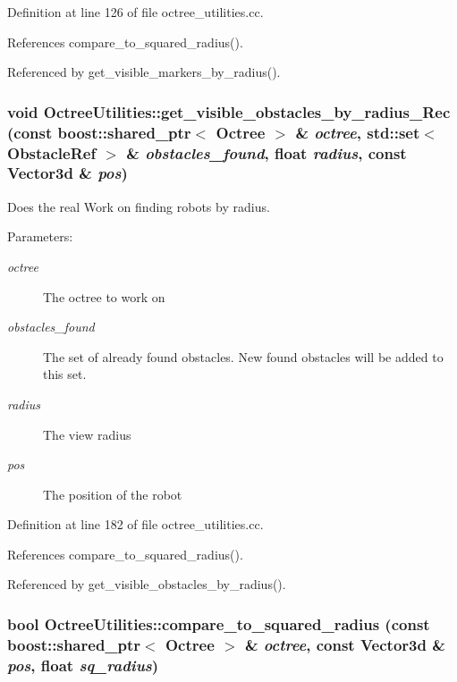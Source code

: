 Definition at line 126 of file octree\_\-utilities.cc.

References compare\_\-to\_\-squared\_\-radius().

Referenced by get\_\-visible\_\-markers\_\-by\_\-radius().\hypertarget{class_octree_utilities_2d10ca715823cfe5ff3804e2b5c1628a}{
\subsubsection[get\_\-visible\_\-obstacles\_\-by\_\-radius\_\-Rec]{\setlength{\rightskip}{0pt plus 5cm}void OctreeUtilities::get\_\-visible\_\-obstacles\_\-by\_\-radius\_\-Rec (const boost::shared\_\-ptr$<$ {\bf Octree} $>$ \& {\em octree}, \/  std::set$<$ ObstacleRef $>$ \& {\em obstacles\_\-found}, \/  float {\em radius}, \/  const Vector3d \& {\em pos})}}
\label{class_octree_utilities_2d10ca715823cfe5ff3804e2b5c1628a}


Does the real Work on finding robots by radius.

\begin{Desc}
\item[Parameters:]
\begin{description}
\item[{\em octree}]The octree to work on \item[{\em obstacles\_\-found}]The set of already found obstacles. New found obstacles will be added to this set. \item[{\em radius}]The view radius \item[{\em pos}]The position of the robot \end{description}
\end{Desc}


Definition at line 182 of file octree\_\-utilities.cc.

References compare\_\-to\_\-squared\_\-radius().

Referenced by get\_\-visible\_\-obstacles\_\-by\_\-radius().\hypertarget{class_octree_utilities_25ecea967e3734fd326470404a043489}{
\subsubsection[compare\_\-to\_\-squared\_\-radius]{\setlength{\rightskip}{0pt plus 5cm}bool OctreeUtilities::compare\_\-to\_\-squared\_\-radius (const boost::shared\_\-ptr$<$ {\bf Octree} $>$ \& {\em octree}, \/  const Vector3d \& {\em pos}, \/  float {\em sq\_\-radius})}}
\label{class_octree_utilities_25ecea967e3734fd326470404a043489}


